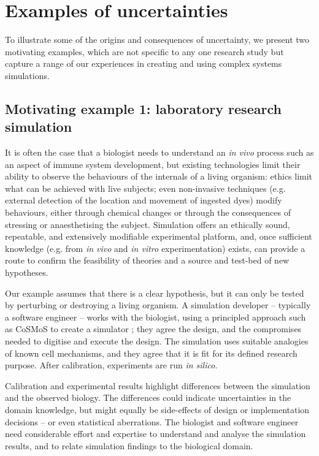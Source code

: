 \documentclass[sigconf,authordraft]{acmart}
\begin{document}
\section{Examples of uncertainties}

To illustrate some of the origins and consequences of uncertainty, we present two motivating examples, which are not specific to any one research study but capture a range of our experiences in creating and using complex systems simulations.

\subsection{Motivating example 1: laboratory research simulation}

It is often the case that a biologist needs to understand an \textit{in vivo} process such as an  aspect of immune system development, but existing technologies limit their ability to observe the behaviours of the internals of a living organism: ethics limit what can be achieved with live subjects; even non-invasive techniques (e.g. external detection of the location and movement of ingested dyes) modify behaviours, either through chemical changes or through the consequences of stressing or anaesthetising the subject.  Simulation offers an ethically sound, repeatable, and extensively modifiable experimental platform, and, once sufficient knowledge (e.g. from \emph{in vivo} and \emph{in vitro} experimentation)  exists, can provide a route to confirm the feasibility of theories and a source and test-bed of new hypotheses.

Our example assumes that there is a clear hypothesis, but it can only be tested by perturbing or destroying a living organism.  A simulation developer -- typically a software engineer -- works with the biologist, using a principled approach such as CoSMoS to create a simulator \cite{aldenPhD,NACO14background}; they agree the design, and the compromises needed to digitise and execute the design.  The simulation uses suitable analogies of known cell mechanisms, and they agree that it is fit for its defined research purpose.  After calibration, experiments are run \emph{in silico}.  

Calibration and experimental results highlight differences between the simulation and the observed biology.  The differences could indicate uncertainties in the domain knowledge, but might equally be side-effects of design or implementation decisions -- or even statistical aberrations.  
The biologist and software engineer need considerable effort and expertise to understand and analyse the simulation results, and to relate simulation findings to the biological domain.  
\end{document}
